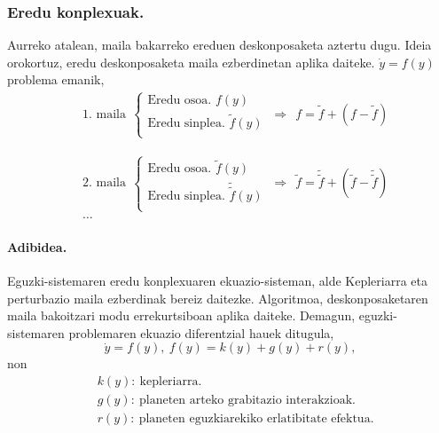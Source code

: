 \subsubsection*{Eredu konplexuak.}
Aurreko atalean, maila bakarreko ereduen deskonposaketa aztertu dugu. Ideia orokortuz, eredu deskonposaketa maila ezberdinetan aplika daiteke.  $\dot{y} =f(y)$ problema emanik, 
\begin{align*}
&\mbox{1. maila} \ \
\left \{ \begin{array}{c}
  \mbox{Eredu osoa.   } f(y) \\[.25cm]
  \mbox{Eredu sinplea.    } \tilde{f}(y)  \\
\end{array} \right.
\ \Rightarrow \ \
f =\tilde{f}+(f-\tilde{f})  
\end{align*}

\begin{align*}
&\mbox{2. maila} \ \
\left \{ \begin{array}{c}
  \mbox{Eredu osoa.   }\tilde{f}(y) \\[.25cm]
  \mbox{Eredu sinplea.    }\tilde{\tilde{f}}(y)  \\
\end{array} \right.
\ \Rightarrow \ \
\tilde{f} =\tilde{\tilde{f}}+({\tilde{f}}-\tilde{\tilde{f}})\\
&\dots  
\end{align*}

\paragraph*{Adibidea.}
Eguzki-sistemaren eredu konplexuaren ekuazio-sisteman, alde Kepleriarra eta perturbazio maila ezberdinak bereiz daitezke. Algoritmoa, deskonposaketaren maila bakoitzari modu errekurtsiboan aplika daiteke. Demagun, eguzki-sistemaren problemaren ekuazio diferentzial hauek ditugula,
\begin{equation*}
\dot{y}=f(y), \ f(y)=k(y)+g(y)+r(y),
\end{equation*}
non
\begin{align*}
&k(y): \ \text{kepleriarra.}\\
&g(y): \ \text{planeten arteko grabitazio interakzioak.}\\
&r(y): \ \text{planeten eguzkiarekiko erlatibitate efektua.}
\end{align*}


